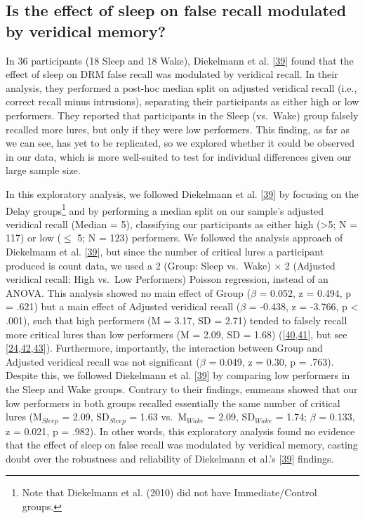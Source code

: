 \documentclass[
]{article}
\begin{document}
\hypertarget{is-the-effect-of-sleep-on-false-recall-modulated-by-veridical-memory}{%
\subsection{Is the effect of sleep on false recall modulated by veridical memory?}\label{is-the-effect-of-sleep-on-false-recall-modulated-by-veridical-memory}}

In 36 participants (18 Sleep and 18 Wake), Diekelmann et al. {[}\protect\hyperlink{ref-diekelmann2010a}{39}{]} found that the effect of sleep on DRM false recall was modulated by veridical recall. In their analysis, they performed a post-hoc median split on adjusted veridical recall (i.e., correct recall minus intrusions), separating their participants as either high or low performers. They reported that participants in the Sleep (vs.~Wake) group falsely recalled more lures, but only if they were low performers. This finding, as far as we can see, has yet to be replicated, so we explored whether it could be observed in our data, which is more well-suited to test for individual differences given our large sample size.

In this exploratory analysis, we followed Diekelmann et al. {[}\protect\hyperlink{ref-diekelmann2010a}{39}{]} by focusing on the Delay groups\footnote{Note that Diekelmann et al. (2010) did not have Immediate/Control groups.} and by performing a median split on our sample's adjusted veridical recall (Median = 5), classifying our participants as either high (\textgreater5; N = 117) or low (\(\leq\) 5; N = 123) performers. We followed the analysis approach of Diekelmann et al. {[}\protect\hyperlink{ref-diekelmann2010a}{39}{]}, but since the number of critical lures a participant produced is count data, we used a 2 (Group: Sleep vs.~Wake) \(\times\) 2 (Adjusted veridical recall: High vs.~Low Performers) Poisson regression, instead of an ANOVA. This analysis showed no main effect of Group (\(\beta\) = 0.052, z = 0.494, p = .621) but a main effect of Adjusted veridical recall (\(\beta\) = -0.438, z = -3.766, p \textless{} .001), such that high performers (M = 3.17, SD = 2.71) tended to falsely recall more critical lures than low performers (M = 2.09, SD = 1.68) ({[}\protect\hyperlink{ref-thapar2001a}{40},\protect\hyperlink{ref-toglia1999a}{41}{]}, but see {[}\protect\hyperlink{ref-roediger2001a}{24},\protect\hyperlink{ref-cann2011a}{42},\protect\hyperlink{ref-stadler1999a}{43}{]}). Furthermore, importantly, the interaction between Group and Adjusted veridical recall was not significant (\(\beta\) = 0.049, z = 0.30, p = .763). Despite this, we followed Diekelmann et al. {[}\protect\hyperlink{ref-diekelmann2010a}{39}{]} by comparing low performers in the Sleep and Wake groups. Contrary to their findings, emmeans showed that our low performers in both groups recalled essentially the same number of critical lures (M\(_{Sleep}\) = 2.09, SD\(_{Sleep}\) = 1.63 vs.~M\(_{Wake}\) = 2.09, SD\(_{Wake}\) = 1.74; \(\beta\) = 0.133, z = 0.021, p = .982). In other words, this exploratory analysis found no evidence that the effect of sleep on false recall was modulated by veridical memory, casting doubt over the robustness and reliability of Diekelmann et al.'s {[}\protect\hyperlink{ref-diekelmann2010a}{39}{]} findings.
\end{document}
